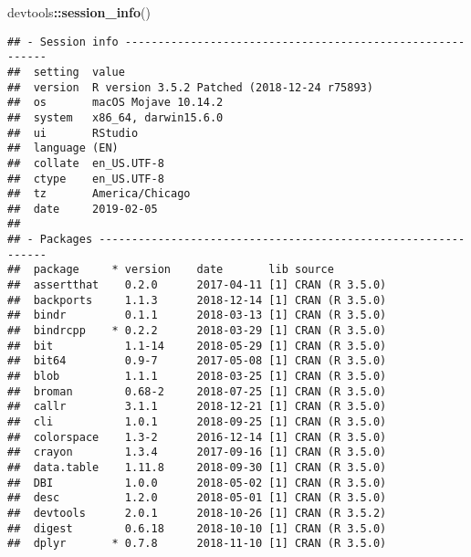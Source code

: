 \documentclass[oneside]{book}
\newenvironment{Shaded}{\begin{snugshade}}{\end{snugshade}}
\newcommand{\KeywordTok}[1]{\textcolor[rgb]{0.13,0.29,0.53}{\textbf{#1}}}
\newcommand{\NormalTok}[1]{#1}
\newcommand{\OperatorTok}[1]{\textcolor[rgb]{0.81,0.36,0.00}{\textbf{#1}}}
\begin{document}
\begin{Shaded}
\begin{Highlighting}[]
\NormalTok{devtools}\OperatorTok{::}\KeywordTok{session_info}\NormalTok{()}
\end{Highlighting}
\end{Shaded}

\begin{verbatim}
## - Session info ----------------------------------------------------------
##  setting  value                                      
##  version  R version 3.5.2 Patched (2018-12-24 r75893)
##  os       macOS Mojave 10.14.2                       
##  system   x86_64, darwin15.6.0                       
##  ui       RStudio                                    
##  language (EN)                                       
##  collate  en_US.UTF-8                                
##  ctype    en_US.UTF-8                                
##  tz       America/Chicago                            
##  date     2019-02-05                                 
## 
## - Packages --------------------------------------------------------------
##  package     * version    date       lib source                           
##  assertthat    0.2.0      2017-04-11 [1] CRAN (R 3.5.0)                   
##  backports     1.1.3      2018-12-14 [1] CRAN (R 3.5.0)                   
##  bindr         0.1.1      2018-03-13 [1] CRAN (R 3.5.0)                   
##  bindrcpp    * 0.2.2      2018-03-29 [1] CRAN (R 3.5.0)                   
##  bit           1.1-14     2018-05-29 [1] CRAN (R 3.5.0)                   
##  bit64         0.9-7      2017-05-08 [1] CRAN (R 3.5.0)                   
##  blob          1.1.1      2018-03-25 [1] CRAN (R 3.5.0)                   
##  broman        0.68-2     2018-07-25 [1] CRAN (R 3.5.0)                   
##  callr         3.1.1      2018-12-21 [1] CRAN (R 3.5.0)                   
##  cli           1.0.1      2018-09-25 [1] CRAN (R 3.5.0)                   
##  colorspace    1.3-2      2016-12-14 [1] CRAN (R 3.5.0)                   
##  crayon        1.3.4      2017-09-16 [1] CRAN (R 3.5.0)                   
##  data.table    1.11.8     2018-09-30 [1] CRAN (R 3.5.0)                   
##  DBI           1.0.0      2018-05-02 [1] CRAN (R 3.5.0)                   
##  desc          1.2.0      2018-05-01 [1] CRAN (R 3.5.0)                   
##  devtools      2.0.1      2018-10-26 [1] CRAN (R 3.5.2)                   
##  digest        0.6.18     2018-10-10 [1] CRAN (R 3.5.0)                   
##  dplyr       * 0.7.8      2018-11-10 [1] CRAN (R 3.5.0)                   

\end{verbatim}
\end{document}
